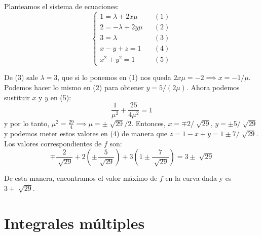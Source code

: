 \documentclass[12pt]{article}
\begin{document}
Planteamos el sistema de ecuaciones:
\[
  \left\{
  \begin{aligned}
	  1 = \lambda + 2x\mu &&(1) \\
	  2 = -\lambda + 2y\mu &&(2) \\
	  3 = \lambda &&(3) \\
	  x-y+z=1 &&(4) \\
	  x^2 + y^2 = 1 &&(5)
  \end{aligned}
  \right.
\]

De (3) sale $ \lambda = 3 $, que si lo ponemos en (1) nos queda $ 2x\mu = -2 \implies x=-1/\mu $. Podemos hacer lo mismo en (2) para obtener $ y=5/(2\mu) $. Ahora podemos sustituir $ x $ y $ y $ en (5):
\[
  \frac{1}{\mu^2} + \frac{25}{4\mu^2} = 1
\]
y por lo tanto, $ \mu^2=\frac{29}{4} \implies \mu=\pm \sqrt[]{29}/2 $. Entonces, $ x=\mp 2/\sqrt[]{29} $, $ y=\pm 5/\sqrt[]{29} $ y podemos meter estos valores en (4) de manera que $ z=1-x+y=1\pm 7/\sqrt[]{29} $. Los valores correspondientes de $ f $ son:
\[
  \mp \frac{2}{\sqrt[]{29}}+2\left(\pm\frac{5}{\sqrt[]{29}}\right)+3\left(1\pm\frac{7}{\sqrt[]{29}}\right)=3\pm \sqrt[]{29}
\]

De esta manera, encontramos el valor máximo de $ f $ en la curva dada y es $ 3+\sqrt[]{29} $.

\section{Integrales múltiples}




\newpage
{}
\printbibliography
\end{document}
